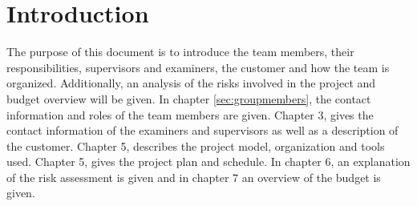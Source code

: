 \chapter{Introduction}
The purpose of this document is to introduce the team members, their responsibilities, supervisors and examiners, the customer and how the team is organized. Additionally, an analysis of the risks involved in the project and budget overview will be given. In chapter \ref{sec:groupmembers}, the contact information and roles of the team members are given. Chapter 3, gives the contact information of the examiners and supervisors as well as a description of the customer. Chapter 5, describes the project model, organization and tools used. Chapter 5, gives the project plan and schedule. In chapter 6, an explanation of the risk assessment is given and in chapter 7 an overview of the budget is given.


